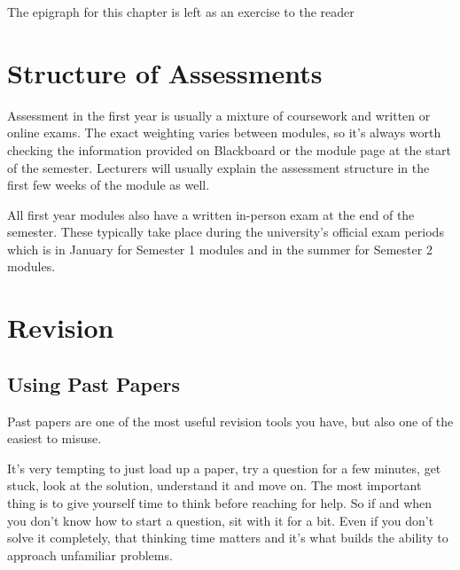 \epigraph{The epigraph for this chapter is left as an exercise to the reader}{}


\section{Structure of Assessments}





Assessment in the first year is usually a mixture of coursework and written or online exams. The exact weighting varies between modules, so it’s always worth checking the information provided on Blackboard or the module page at the start of the semester. Lecturers will usually explain the assessment structure in the first few weeks of the module as well.

All first year modules also have a written in-person exam at the end of the semester. These typically take place during the university’s official exam periods which is in January for Semester 1 modules and in the summer for Semester 2 modules.

\section{Revision}

\subsection{Using Past Papers}

Past papers are one of the most useful revision tools you have, but also one of the easiest to misuse. 

It's very tempting to just load up a paper, try a question for a few minutes, get stuck, look at the solution, understand it and move on. The most important thing is to give yourself time to think before reaching for help. So if and when you don't know how to start a question, sit with it for a bit. Even if you don't solve it completely, that thinking time matters and it's what builds the ability to approach unfamiliar problems. 


